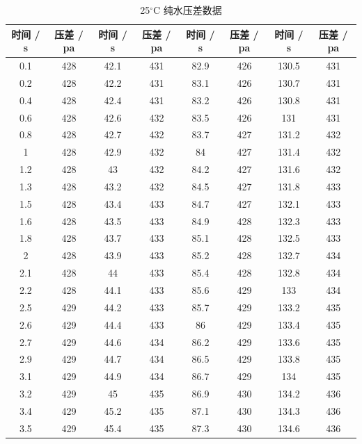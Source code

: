 \documentclass[12pt]{ctexart}
\numberwithin{equation}{section}
\begin{document}
\begin{longtable}{cc|cc|cc|cc}
    \caption{25$^\circ$C 纯水压差数据} \\
    \hline
    时间 / s & 压差 / pa & 时间 / s & 压差 / pa & 时间 / s & 压差 / pa & 时间 / s & 压差 / pa \\
    \hline
    0.1  &  428  &  42.1  &  431  &  82.9  &  426  &  130.5  &  431  \\
0.2  &  428  &  42.2  &  431  &  83.1  &  426  &  130.7  &  431  \\
0.4  &  428  &  42.4  &  431  &  83.2  &  426  &  130.8  &  431  \\
0.6  &  428  &  42.6  &  432  &  83.5  &  426  &  131  &  431  \\
0.8  &  428  &  42.7  &  432  &  83.7  &  427  &  131.2  &  432  \\
1  &  428  &  42.9  &  432  &  84  &  427  &  131.4  &  432  \\
1.2  &  428  &  43  &  432  &  84.2  &  427  &  131.6  &  432  \\
1.3  &  428  &  43.2  &  432  &  84.5  &  427  &  131.8  &  433  \\
1.5  &  428  &  43.4  &  433  &  84.7  &  427  &  132.1  &  433  \\
1.6  &  428  &  43.5  &  433  &  84.9  &  428  &  132.3  &  433  \\
1.8  &  428  &  43.7  &  433  &  85.1  &  428  &  132.5  &  433  \\
2  &  428  &  43.9  &  433  &  85.2  &  428  &  132.7  &  434  \\
2.1  &  428  &  44  &  433  &  85.4  &  428  &  132.8  &  434  \\
2.2  &  428  &  44.1  &  433  &  85.6  &  429  &  133  &  434  \\
2.5  &  429  &  44.2  &  433  &  85.7  &  429  &  133.2  &  435  \\
2.6  &  429  &  44.4  &  433  &  86  &  429  &  133.4  &  435  \\
2.7  &  429  &  44.6  &  434  &  86.2  &  429  &  133.6  &  435  \\
2.9  &  429  &  44.7  &  434  &  86.5  &  429  &  133.8  &  435  \\
3.1  &  429  &  44.9  &  434  &  86.7  &  429  &  134  &  435  \\
3.2  &  429  &  45  &  435  &  86.9  &  430  &  134.2  &  436  \\
3.4  &  429  &  45.2  &  435  &  87.1  &  430  &  134.3  &  436  \\
3.5  &  429  &  45.4  &  435  &  87.3  &  430  &  134.6  &  436  \\

\end{longtable}
\end{document}
